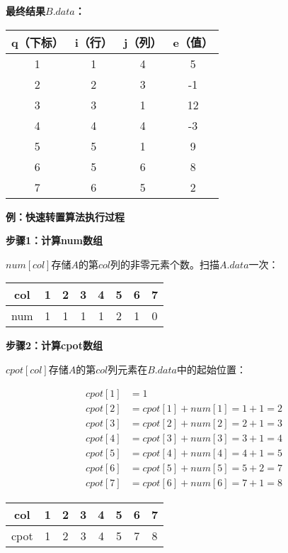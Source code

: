 \documentclass[12pt,a4paper]{amsart}
\begin{document}
\textbf{最终结果$B.data$：}

\begin{center}
\begin{tabular}{|c|c|c|c|}
\hline
q（下标） & i（行） & j（列） & e（值） \\
\hline
1 & 1 & 4 & 5 \\
2 & 2 & 3 & -1 \\
3 & 3 & 1 & 12 \\
4 & 4 & 4 & -3 \\
5 & 5 & 1 & 9 \\
6 & 5 & 6 & 8 \\
7 & 6 & 5 & 2 \\
\hline
\end{tabular}
\end{center}

\textbf{例：快速转置算法执行过程}

\textbf{步骤1：计算num数组}

$num[col]$存储$A$的第$col$列的非零元素个数。扫描$A.data$一次：

\begin{center}
\begin{tabular}{|c|c|c|c|c|c|c|c|}
\hline
col & 1 & 2 & 3 & 4 & 5 & 6 & 7 \\
\hline
num & 1 & 1 & 1 & 1 & 2 & 1 & 0 \\
\hline
\end{tabular}
\end{center}

\textbf{步骤2：计算cpot数组}

$cpot[col]$存储$A$的第$col$列元素在$B.data$中的起始位置：

\begin{align}
cpot[1] &= 1 \\
cpot[2] &= cpot[1] + num[1] = 1 + 1 = 2 \\
cpot[3] &= cpot[2] + num[2] = 2 + 1 = 3 \\
cpot[4] &= cpot[3] + num[3] = 3 + 1 = 4 \\
cpot[5] &= cpot[4] + num[4] = 4 + 1 = 5 \\
cpot[6] &= cpot[5] + num[5] = 5 + 2 = 7 \\
cpot[7] &= cpot[6] + num[6] = 7 + 1 = 8
\end{align}

\begin{center}
\begin{tabular}{|c|c|c|c|c|c|c|c|}
\hline
col & 1 & 2 & 3 & 4 & 5 & 6 & 7 \\
\hline
cpot & 1 & 2 & 3 & 4 & 5 & 7 & 8 \\
\hline
\end{tabular}
\end{center}
\end{document}

